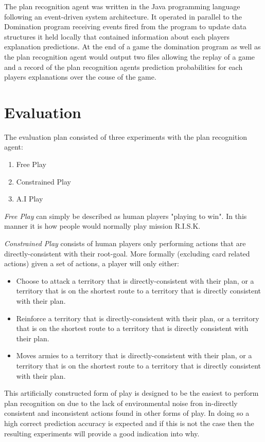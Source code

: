 \documentclass[parskip]{cs4rep}
\begin{document}
The plan recognition agent was written in the Java programming language following an event-driven system architecture. It operated in parallel to the Domination program receiving events fired from the program to update data structures it held locally that contained information about each players explanation predictions. At the end of a game the domination program as well as the plan recognition agent would output two files allowing the replay of a game and a record of the plan recognition agents prediction probabilities for each players explanations over the couse of the game.

\chapter{Evaluation} 

The evaluation plan consisted of three experiments with the plan recognition agent:

\begin{enumerate}
\item
Free Play
\item
Constrained Play
\item
A.I Play
\end{enumerate}

\textit{Free Play} can simply be described as human players "playing to win". In this manner it is how people would normally play mission R.I.S.K.

\textit{Constrained Play} consists of human players only performing actions that are directly-consistent with their root-goal.  More formally (excluding card related actions) given a set of actions, a player will only either:

\begin{itemize}
\item
Choose to attack a territory that is directly-consistent with their plan, or a territory that is on the shortest route to a territory that is directly consistent with their plan.
\item
Reinforce a territory that is directly-consistent with their plan, or a territory that is on the shortest route to a territory that is directly consistent with their plan.
\item
Moves armies to a territory that is directly-consistent with their plan, or a territory that is on the shortest route to a territory that is directly consistent with their plan.
\end{itemize}

This artificially constructed form of play is designed to be the easiest to perform plan recognition on due to the lack of environmental noise fron in-directly consistent and inconsistent actions found in other forms of play. In doing so a high correct prediction accuracy is expected and if this is not the case then the resulting experiments will provide a good indication into why.
\end{document}
